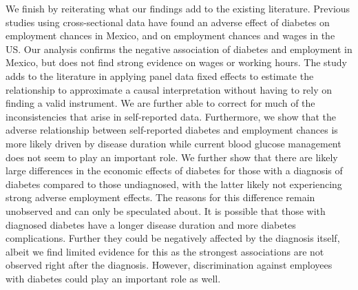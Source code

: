 We finish by reiterating what our findings add to the existing literature.
Previous studies using cross-sectional data have found an adverse
effect of diabetes on employment chances in Mexico, and on employment
chances and wages in the US. Our analysis confirms the negative association
of diabetes and employment in Mexico, but does not find strong evidence
on wages or working hours. The study adds to the literature in applying
panel data fixed effects to estimate the relationship to approximate
a causal interpretation without having to rely on finding a valid
instrument. We are further able to correct for much of the inconsistencies
that arise in self-reported data. Furthermore, we show that the adverse
relationship between self-reported diabetes and employment chances
is more likely driven by disease duration while current blood glucose
management does not seem to play an important role. We further show
that there are likely large differences in the economic effects of
diabetes for those with a diagnosis of diabetes compared to those
undiagnosed, with the latter likely not experiencing strong adverse
employment effects. The reasons for this difference remain unobserved
and can only be speculated about. It is possible that those with diagnosed
diabetes have a longer disease duration and more diabetes complications.
Further they could be negatively affected by the diagnosis itself,
albeit we find limited evidence for this as the strongest associations
are not observed right after the diagnosis. However, discrimination
against employees with diabetes could play an important role as well.
  
  